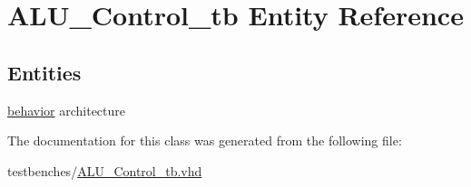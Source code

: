 \hypertarget{class_a_l_u___control__tb}{\section{\-A\-L\-U\-\_\-\-Control\-\_\-tb \-Entity \-Reference}
\label{class_a_l_u___control__tb}
}
\subsection*{\-Entities}
\begin{DoxyCompactItemize}
\item 
\hyperlink{class_a_l_u___control__tb_1_1behavior}{behavior} architecture
\end{DoxyCompactItemize}


\-The documentation for this class was generated from the following file\-:\begin{DoxyCompactItemize}
\item 
testbenches/\hyperlink{_a_l_u___control__tb_8vhd}{\-A\-L\-U\-\_\-\-Control\-\_\-tb.\-vhd}\end{DoxyCompactItemize}
